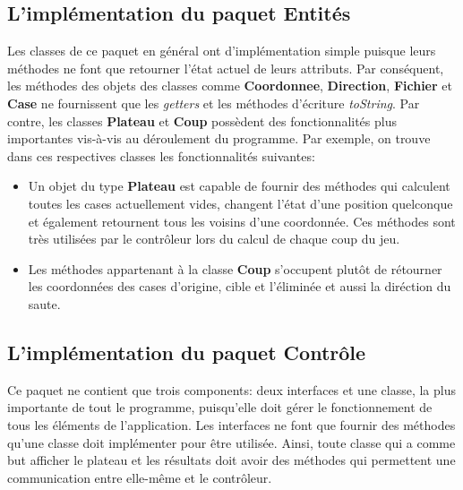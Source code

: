 \documentclass{article}
\begin{document}
\subsection{L'implémentation du paquet \og Entités \fg}

Les classes de ce paquet en général ont d'implémentation simple puisque leurs
méthodes ne font que retourner l'état actuel de leurs attributs. Par conséquent,
les méthodes des objets des classes comme \textbf{Coordonnee},
\textbf{Direction}, \textbf{Fichier} et \textbf{Case} ne fournissent que les
\textit{getters} et les méthodes d'écriture \textit{toString}. Par contre, les
classes \textbf{Plateau} et \textbf{Coup} possèdent des fonctionnalités plus
importantes vis-à-vis au déroulement du programme. Par exemple, on trouve dans
ces respectives classes les fonctionnalités suivantes:

\vspace{12pt}

\begin{itemize}
  
  \item Un objet du type \textbf{Plateau} est capable de fournir des méthodes
  qui calculent toutes les cases actuellement vides, changent l'état d'une
  position quelconque et également retournent tous les voisins d'une coordonnée.
  Ces méthodes sont très utilisées par le contrôleur lors du calcul de chaque
  coup du jeu.
  
  \vspace{12pt}
  
  \item Les méthodes appartenant à la classe \textbf{Coup} s'occupent plutôt de
  rétourner les coordonnées des cases d'origine, cible et l'éliminée et aussi la
  diréction du saute.
\end{itemize} 

\subsection{L'implémentation du paquet \og Contrôle \fg}

Ce paquet ne contient que trois components: deux interfaces et une classe, la
plus importante de tout le programme, puisqu'elle doit gérer le fonctionnement
de tous les éléments de l'application. Les interfaces ne font que fournir des
méthodes qu'une classe doit implémenter pour être utilisée. Ainsi, toute
classe qui a comme but afficher le plateau et les résultats doit avoir des
méthodes qui permettent une communication entre elle-même et le contrôleur.
\end{document}
